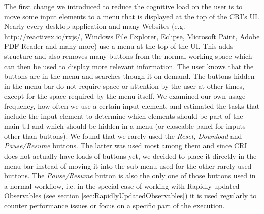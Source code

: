 The first change we introduced to reduce the cognitive load on the user is to move some input elements to a menu that is displayed at the top of the CRI's UI. Nearly every desktop application and many Websites (e.g. http://reactivex.io/rxjs/, Windows File Explorer, Eclipse, Microsoft Paint, Adobe PDF Reader and many more) use a menu at the top of the UI. This adds structure and also removes many buttons from the normal working space which can then be used to display more relevant information. The user knows that the buttons are in the menu and searches though it on demand. The buttons hidden in the menu bar do not require space or attention by the user at other times, except for the space required by the menu itself. We examined our own usage frequency, how often we use a certain input element, and estimated the tasks that include the input element to determine which elements should be part of the main UI and which should be hidden in a menu (or closeable panel for inputs other than buttons). We found that we rarely used the \emph{Reset}, \emph{Download} and \emph{Pause/Resume} buttons. The latter was used most among them and since CRI does not actually have loads of buttons yet, we decided to place it directly in the menu bar instead of moving it into the sub menu used for the other rarely used buttons. The \emph{Pause/Resume} button is also the only one of those buttons used in a normal workflow, i.e. in the special case of working with Rapidly updated Observables (see section \ref{sec:RapidlyUpdatedObservables}) it is used regularly to counter performance issues or focus on a specific part of the execution.  %
